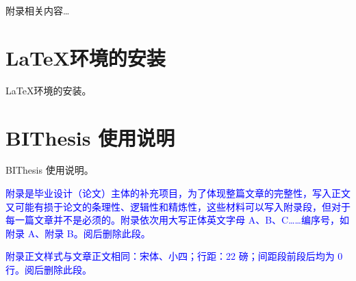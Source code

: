 
\begin{appendices}
  附录相关内容…


  \section{\LaTeX 环境的安装}
  \LaTeX 环境的安装。

  \section{BIThesis 使用说明}
  BIThesis 使用说明。

  \textcolor{blue}{附录是毕业设计（论文）主体的补充项目，为了体现整篇文章的完整性，写入正文又可能有损于论文的条理性、逻辑性和精炼性，这些材料可以写入附录段，但对于每一篇文章并不是必须的。附录依次用大写正体英文字母 A、B、C……编序号，如附录 A、附录 B。阅后删除此段。}

  \textcolor{blue}{附录正文样式与文章正文相同：宋体、小四；行距：22 磅；间距段前段后均为 0 行。阅后删除此段。}

\end{appendices}
